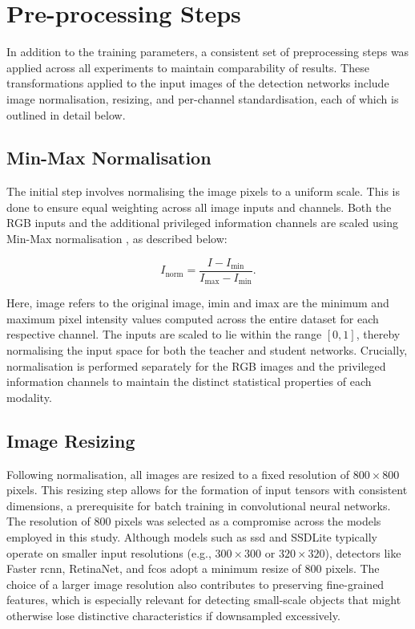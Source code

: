 \section{Pre-processing Steps}
\label{sec:4_preprocessing}

In addition to the training parameters, a consistent set of preprocessing steps was applied across all experiments to maintain comparability of results. These transformations applied to the input images of the detection networks include image normalisation, resizing, and per-channel standardisation, each of which is outlined in detail below.

\subsection{Min-Max Normalisation}
\label{subsec:4_normalisation}

The initial step involves normalising the image pixels to a uniform scale. This is done to ensure equal weighting across all image inputs and channels. Both the RGB inputs and the additional privileged information channels are scaled using Min-Max normalisation \cite{min_max_normalisation}, as described below:

\begin{equation} \label{eq:min_max}
I_{\text{norm}} = \frac{I - I_{\text{min}}}{I_{\text{max}} - I_{\text{min}}} .
\end{equation}

\noindent Here, \gls{image} refers to the original image, \gls{imin} and \gls{imax} are the minimum and maximum pixel intensity values computed across the entire dataset for each respective channel. The inputs are scaled to lie within the range $[0, 1]$, thereby normalising the input space for both the teacher and student networks. Crucially, normalisation is performed separately for the RGB images and the privileged information channels to maintain the distinct statistical properties of each modality. 

\subsection{Image Resizing}
\label{subsec:4_resizing}

Following normalisation, all images are resized to a fixed resolution of $800 \times 800$ pixels. This resizing step allows for the formation of input tensors with consistent dimensions, a prerequisite for batch training in convolutional neural networks. The resolution of $800$ pixels was selected as a compromise across the models employed in this study.
Although models such as \gls{ssd} and SSDLite typically operate on smaller input resolutions (e.g., $300 \times 300$ or $320 \times 320$), detectors like Faster \gls{rcnn}, RetinaNet, and \gls{fcos} adopt a minimum resize of $800$ pixels. The choice of a larger image resolution also contributes to preserving fine-grained features, which is especially relevant for detecting small-scale objects that might otherwise lose distinctive characteristics if downsampled excessively.


